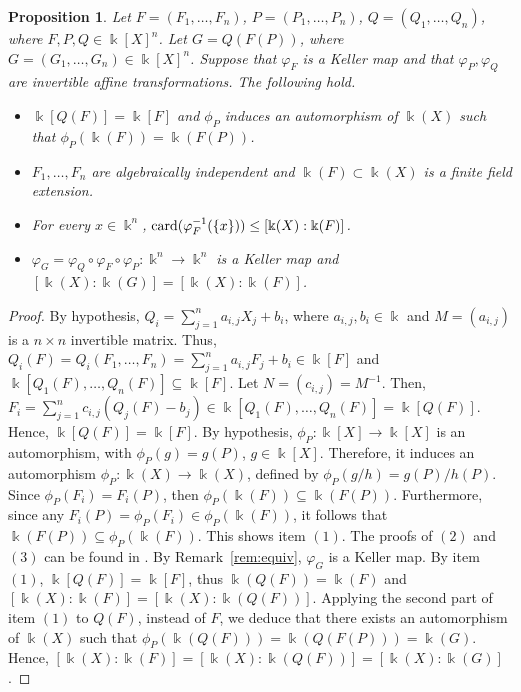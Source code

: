 \documentclass[11pt,reqno]{amsart}
\newtheorem{proposition}[theorem]{Proposition}
\theoremstyle{definition}
\newcommand{\mbk}{\mbox{$\Bbbk$}}
\newcommand{\card}{\mbox{${\rm card}$}}
\begin{document}
\begin{proposition}\label{prop:algext}
Let $F=(F_1,\ldots,F_n)$, $P=(P_1,\ldots,P_n)$, $Q=(Q_1,\ldots,Q_n)$, where
$F,P,Q\in\mbk[X]^n$. Let $G=Q(F(P))$, where $G=(G_1,\ldots,G_n)\in\mbk[X]^n$. Suppose that $\varphi_F$ is a Keller map and that $\varphi_P,\varphi_Q$ are invertible affine transformations. The following hold.
\begin{itemize}
\item[$(1)$] $\mbk[Q(F)]=\mbk[F]$ and $\phi_P$ induces an automorphism of  
$\mbk(X)$ such that $\phi_P(\mbk(F))=\mbk(F(P))$. 
\item[$(2)$] $F_1,\ldots,F_n$ are algebraically independent and $\mbk(F)\subset\mbk(X)$ is a finite
field extension.
\item[$(3)$] For every $x\in\mbk^n$, $\card(\varphi_F^{-1}(\{x\}))\leq [\mbk(X):\mbk(F)]$.
\item[$(4)$] $\varphi_G=\varphi_Q\circ\varphi_F\circ\varphi_P:\mbk^n\to\mbk^n$ is a Keller map
and $[\mbk(X):\mbk(G)]=[\mbk(X):\mbk(F)]$.
\end{itemize}
\end{proposition}
\begin{proof}
By hypothesis, $Q_i=\sum_{j=1}^na_{i,j}X_j+b_i$, where $a_{i,j},b_i\in\mbk$ and $M=(a_{i,j})$ is a
$n\times n$ invertible matrix. Thus, $Q_i(F)=Q_i(F_1,\ldots,F_n)=\sum_{j=1}^na_{i,j}F_j+b_i\in\mbk[F]$ and
$\mbk[Q_1(F),\ldots,Q_n(F)]\subseteq \mbk[F]$. Let $N=(c_{i,j})=M^{-1}$.
Then, $F_i=\sum_{j=1}^nc_{i,j}(Q_j(F)-b_j)\in\mbk[Q_1(F),\ldots,Q_n(F)]=\mbk[Q(F)]$. Hence, 
$\mbk[Q(F)]=\mbk[F]$. By hypothesis, $\phi_P:\mbk[X]\to\mbk[X]$ is an automorphism, with
$\phi_P(g)=g(P)$, $g\in\mbk[X]$. Therefore, it induces an automorphism 
$\phi_P:\mbk(X)\to\mbk(X)$, defined by $\phi_P(g/h)=g(P)/h(P)$. Since 
$\phi_P(F_i)=F_i(P)$, then $\phi_P(\mbk(F))\subseteq \mbk(F(P))$. Furthermore, since any $F_i(P)=\phi_P(F_i)\in\phi_P(\mbk(F))$, it follows that $\mbk(F(P))\subseteq\phi_P(\mbk(F))$.
This shows item $(1)$. The proofs of $(2)$ and $(3)$ can be found in 
\cite[Proposition~1.1.31 and Theorem~1.1.32]{vde1}. By Remark~\ref{rem:equiv}, 
$\varphi_G$ is a Keller map. By item $(1)$, $\mbk[Q(F)]=\mbk[F]$, thus
$\mbk(Q(F))=\mbk(F)$ and $[\mbk(X):\mbk(F)]=[\mbk(X):\mbk(Q(F))]$. Applying the second part of item $(1)$ to $Q(F)$, instead of $F$, we deduce that there exists an automorphism of $\mbk(X)$ such that
$\phi_P(\mbk(Q(F)))=\mbk(Q(F(P)))=\mbk(G)$. Hence, 
$[\mbk(X):\mbk(F)]=[\mbk(X):\mbk(Q(F))]=[\mbk(X):\mbk(G)]$.
\end{proof}
\end{document}

